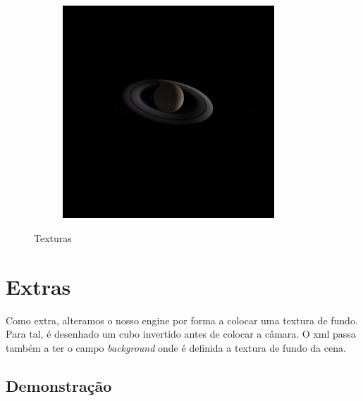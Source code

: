 \documentclass[11pt,a4paper]{report}
\begin{document}
\begin{figure}[H]
\begin{subfigure}{0.5\textwidth}
  \caption{\texttt{}}
  \label{fig:jupiter}
\end{subfigure}%
\begin{subfigure}{0.5\textwidth}
  \centering
  \includegraphics[width = 8cm,height = 8cm]{saturn.png}
  \caption{\texttt{}}
  \label{fig:saturn}
\end{subfigure}
\label{fig:texturas}
\caption{Texturas}
\end{figure}



\newpage
\section{Extras}
Como extra, alteramos o nosso engine por forma a colocar uma textura de fundo.
Para tal, é desenhado um cubo invertido antes de colocar a câmara. O xml passa também a ter o campo \textit{background} onde é definida a textura de fundo da cena.

\subsection{Demonstração}
\end{document}

